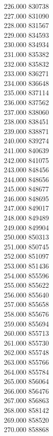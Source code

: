 { 226.000	830738 \\
 227.000	831090 \\
 228.000	831567 \\
 229.000	834593 \\
 230.000	834934 \\
 231.000	835382 \\
 232.000	835832 \\
 233.000	836271 \\
 234.000	836648 \\
 235.000	837114 \\
 236.000	837562 \\
 237.000	838060 \\
 238.000	838451 \\
 239.000	838871 \\
 240.000	839274 \\
 241.000	840639 \\
 242.000	841075 \\
 243.000	848456 \\
 244.000	848656 \\
 245.000	848677 \\
 246.000	848695 \\
 247.000	849017 \\
 248.000	849489 \\
 249.000	849904 \\
 250.000	850313 \\
 251.000	850745 \\
 252.000	851097 \\
 253.000	851436 \\
 254.000	855596 \\
 255.000	855622 \\
 256.000	855640 \\
 257.000	855658 \\
 258.000	855676 \\
 259.000	855694 \\
 260.000	855713 \\
 261.000	855730 \\
 262.000	855748 \\
 263.000	855766 \\
 264.000	855784 \\
 265.000	856064 \\
 266.000	856476 \\
 267.000	856863 \\
 268.000	858142 \\
 269.000	858520 \\
 270.000	858868 \\
}
